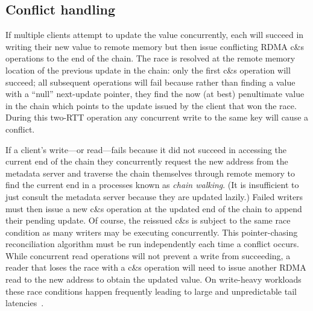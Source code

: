 \subsection{Conflict handling}

If multiple clients attempt to update the value concurrently, each
will succeed in writing their new value to remote memory but then
issue conflicting RDMA c\&s operations to the end of the chain.  The
race is resolved at the remote memory location of the previous update
in the chain: only the first c\&s operation will succeed; all
subsequent operations will fail because rather than finding a value
with a ``null'' next-update pointer, they find the now (at best)
penultimate value in the chain which points to the update issued by
the client that won the race.
During this
two-RTT operation any concurrent write to the same key will cause a
conflict.



If a client's write---or read---fails because it did not succeed in
accessing the current end of the chain they concurrently request the
new address from the metadata server and traverse the chain themselves
through remote memory to find the current end in a processes known as
\emph{chain walking}.  (It is insufficient to just consult the
metadata server because they are updated lazily.)  Failed writers must
then issue a new c\&s operation at the updated end of the chain to append
their pending update.  Of course, the reissued c\&s is subject to the
same race condition as many writers may be executing
concurrently. This pointer-chasing reconciliation algorithm must be
run independently each time a conflict occurs.
While concurrent read operations will not prevent a write from
succeeding, a reader that loses the race with a c\&s operation will
need to issue another RDMA read to the new address to obtain the
updated value.  On write-heavy workloads these race conditions happen
frequently
leading to large and unpredictable tail latencies~\cite{clover}.




